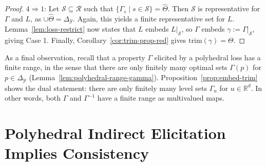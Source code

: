 \documentclass[11pt]{article}
\newcommand{\reals}{\mathbb{R}}
\newcommand{\simplex}{\Delta_\Y}
\newcommand{\R}{\mathcal{R}}
\newcommand{\Sc}{\mathcal{S}}
\newcommand{\U}{\mathcal{U}}
\newcommand{\Y}{\mathcal{Y}}
\newcommand{\trimred}{\mathrm{trim}}
\begin{document}
\begin{proof}
  $4 \Rightarrow 1$:
  Let $\Sc\subseteq\R$ such that $\{\Gamma_s \mid s\in\Sc\} = \hat \Theta$.
  Then $\Sc$ is representative for $\Gamma$ and $L$, as $\cup\hat\Theta = \simplex$.
  Again, this yields a finite representative set for $L$.
  Lemma~\ref{lem:loss-restrict} now states that $L$ embeds $L|_\Sc$, so $\Gamma$ embeds $\gamma := \Gamma|_\Sc$, giving Case 1.
  Finally, Corollary~\ref{cor:trim-prop-red} gives $\trimred(\gamma) = \Theta$.
\end{proof}

As a final observation, recall that a property $\Gamma$ elicited by a polyhedral loss has a finite range, in the sense that there are only finitely many optimal sets $\Gamma(p)$ for $p\in\simplex$ (Lemma~\ref{lem:polyhedral-range-gamma}).
Proposition~\ref{prop:embed-trim} shows the dual statement: there are only finitely many level sets $\Gamma_u$ for $u\in\reals^d$.
In other words, both $\Gamma$ and $\Gamma^{-1}$ have a finite range as multivalued maps.

\section{Polyhedral Indirect Elicitation Implies Consistency}
\label{sec:poly-ie-consistency}
\end{document}
